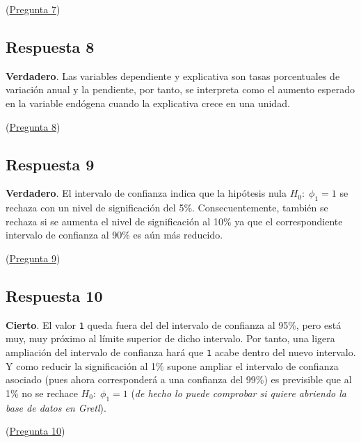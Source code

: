 \documentclass[10pt]{article}
\begin{document}
(\hyperref[sec:orga8641da]{Pregunta 7})
\subsection*{Respuesta 8}
\label{sec:org919af4b}

\textbf{Verdadero}. Las variables dependiente y explicativa son tasas
porcentuales de variación anual y la pendiente, por tanto, se
interpreta como el aumento esperado en la variable endógena cuando la
explicativa crece en una unidad.

(\hyperref[sec:org1ae4693]{Pregunta 8})
\subsection*{Respuesta 9}
\label{sec:org5f65151}

\textbf{Verdadero}. El intervalo de confianza indica que la hipótesis nula
\(H_0:\; \phi_1=1\) se rechaza con un nivel de significación del
5\%. Consecuentemente, también se rechaza si se aumenta el nivel de
significación al 10\% ya que el correspondiente intervalo de confianza
al 90\% es aún más reducido.

(\hyperref[sec:org48a22b3]{Pregunta 9})
\subsection*{Respuesta 10}
\label{sec:org9e54142}

\textbf{Cierto}. El valor \texttt{1} queda fuera del del intervalo de confianza al
95\%, pero está muy, muy próximo al límite superior de dicho intervalo.
Por tanto, una ligera ampliación del intervalo de confianza hará que
\texttt{1} acabe dentro del nuevo intervalo. Y como reducir la significación
al 1\% supone ampliar el intervalo de confianza asociado (pues ahora
corresponderá a una confianza del 99\%) es previsible que al 1\% no se
rechace \(H_0:\; \phi_1=1\) (\emph{de hecho lo puede comprobar si quiere
abriendo la base de datos en Gretl}).

(\hyperref[sec:orgca7a355]{Pregunta 10})
\end{document}
